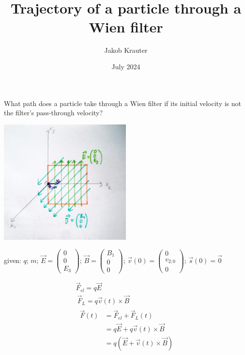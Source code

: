 \documentclass[a4paper, 10pt]{article}
\title{Trajectory of a particle through a Wien filter}
\author{Jakob Krauter}
\date{July 2024}
\begin{document}
\maketitle

What path does a particle take through a Wien filter if its initial velocity is not the filter's pass-through velocity?

\vspace{2pt}

\centering
\includegraphics[width=0.5\textwidth]{sketch}

\vspace{2pt}

given: $q$; $m$; $\vec{E}=\begin{pmatrix} 0 \\ 0 \\ E_3 \end{pmatrix}$; $\vec{B}=\begin{pmatrix} B_1 \\ 0 \\ 0 \end{pmatrix}$; $\vec{v}(0)=\begin{pmatrix} 0 \\ v_{2;0} \\ 0 \end{pmatrix}$; $\vec{s}(0) = \vec{0}$

\vspace{2pt}

\begin{gather}
\vec{F}_{el} = q \vec{E} \\\
%
\vec{F}_L = q \vec{v}(t) \times \vec{B} \\\
%
\begin{split}
\vec{F}(t) &= \vec{F}_{el} + \vec{F}_L(t)		\\\
           &= q \vec{E} + q \vec{v}(t) \times \vec{B}   \\\
           &= q (\vec{E} + \vec{v}(t) \times \vec{B})
\end{split}
\end{gather}
\end{document}

